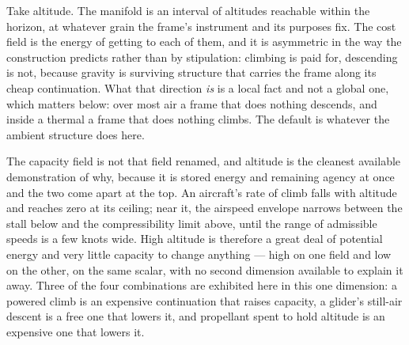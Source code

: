 \documentclass[11pt,a4paper]{article}
\theoremstyle{remark}
\begin{document}
Take altitude. The manifold is an interval of altitudes reachable within the horizon, at whatever
grain the frame's instrument and its purposes fix. The cost field is the energy of getting to each
of them, and it is asymmetric in the way the construction predicts rather than by stipulation:
climbing is paid for, descending is not, because gravity is surviving structure that carries the
frame along its cheap continuation. What that direction \emph{is} is a local fact and not a global
one, which matters below: over most air a frame that does nothing descends, and inside a thermal a
frame that does nothing climbs. The default is whatever the ambient structure does here.

The capacity field is not that field renamed, and altitude is the cleanest available demonstration
of why, because it is stored energy and remaining agency at once and the two come apart at the top.
An aircraft's rate of climb falls with altitude and reaches zero at its ceiling; near it, the
airspeed envelope narrows between the stall below and the compressibility limit above, until the
range of admissible speeds is a few knots wide. High altitude is therefore a great deal of potential
energy and very little capacity to change anything --- high on one field and low on the other, on the
same scalar, with no second dimension available to explain it away. Three of the four combinations
are exhibited here in this one dimension: a powered climb is an expensive continuation that raises
capacity, a glider's still-air descent is a free one that lowers it, and propellant spent to hold
altitude is an expensive one that lowers it.
\end{document}
